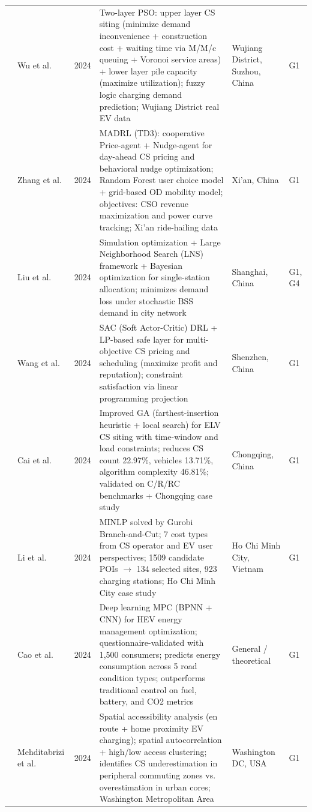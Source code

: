 \documentclass[letterpaper, 12pt, oneside, doublespacing]{Thesis}
\begin{document}
\begin{longtable}{L{0.9cm} L{2.2cm} L{0.8cm} L{3.3cm} L{2.5cm} L{1.5cm}}
\cite{a_two-layer_2024} & Wu et al. & 2024 & Two-layer PSO: upper layer CS siting (minimize demand inconvenience + construction cost + waiting time via M/M/c queuing + Voronoi service areas) + lower layer pile capacity (maximize utilization); fuzzy logic charging demand prediction; Wujiang District real EV data & Wujiang District, Suzhou, China & G1 \\
\cite{advancing_urban_2024} & Zhang et al. & 2024 & MADRL (TD3): cooperative Price-agent + Nudge-agent for day-ahead CS pricing and behavioral nudge optimization; Random Forest user choice model + grid-based OD mobility model; objectives: CSO revenue maximization and power curve tracking; Xi'an ride-hailing data & Xi'an, China & G1 \\
\cite{battery_swapping_2024} & Liu et al. & 2024 & Simulation optimization + Large Neighborhood Search (LNS) framework + Bayesian optimization for single-station allocation; minimizes demand loss under stochastic BSS demand in city network & Shanghai, China & G1, G4 \\
\cite{beyond_profit_2024} & Wang et al. & 2024 & SAC (Soft Actor-Critic) DRL + LP-based safe layer for multi-objective CS pricing and scheduling (maximize profit and reputation); constraint satisfaction via linear programming projection & Shenzhen, China & G1 \\
\cite{charging_station_2024} & Cai et al. & 2024 & Improved GA (farthest-insertion heuristic + local search) for ELV CS siting with time-window and load constraints; reduces CS count 22.97\%, vehicles 13.71\%, algorithm complexity 46.81\%; validated on C/R/RC benchmarks + Chongqing case study & Chongqing, China & G1 \\
\cite{electric_vehicle_2024} & Li et al. & 2024 & MINLP solved by Gurobi Branch-and-Cut; 7 cost types from CS operator and EV user perspectives; 1509 candidate POIs $\rightarrow$ 134 selected sites, 923 charging stations; Ho Chi Minh City case study & Ho Chi Minh City, Vietnam & G1 \\
\cite{energy_management_2024} & Cao et al. & 2024 & Deep learning MPC (BPNN + CNN) for HEV energy management optimization; questionnaire-validated with 1,500 consumers; predicts energy consumption across 5 road condition types; outperforms traditional control on fuel, battery, and CO2 metrics & General {\slash} theoretical & G1 \\
\cite{integrating_en_2024} & Mehditabrizi et al. & 2024 & Spatial accessibility analysis (en route + home proximity EV charging); spatial autocorrelation + high/low access clustering; identifies CS underestimation in peripheral commuting zones vs. overestimation in urban cores; Washington Metropolitan Area & Washington DC, USA & G1 \\

\end{longtable}
\end{document}
